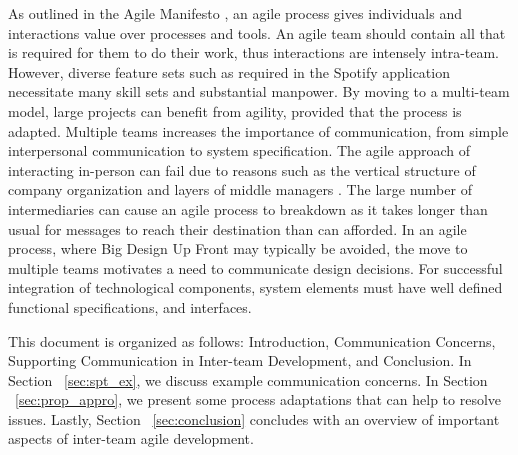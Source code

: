 As outlined in the Agile Manifesto \cite{beck2001agile}, an agile process gives individuals and interactions value over processes and tools.
An agile team should contain all that is required for them to do their work, thus interactions are intensely intra-team.
However, diverse feature sets such as required in the Spotify application necessitate many skill sets and substantial manpower.
By moving to a multi-team model, large projects can benefit from agility, provided that the process is adapted.
Multiple teams increases the importance of communication, from simple interpersonal communication to system specification. 
The agile approach of interacting in-person can fail due to reasons such as the vertical structure of company organization and layers of middle managers \cite{dzone_article}.
The large number of intermediaries can cause an agile process to breakdown as it takes longer than usual for messages to reach their destination than can afforded.
In an agile process, where Big Design Up Front may typically be avoided, the move to multiple teams motivates a need to communicate design decisions.
For successful integration of technological components, system elements must have well defined functional specifications, and interfaces.


This document is organized as follows: Introduction, Communication Concerns, Supporting Communication in Inter-team Development, and Conclusion. 
In Section ~\ref{sec:spt_ex}, we discuss example communication concerns.
In Section ~\ref{sec:prop_appro}, we present some process adaptations that can help to resolve issues.
Lastly, Section ~\ref{sec:conclusion} concludes with an overview of important aspects of inter-team agile development.


